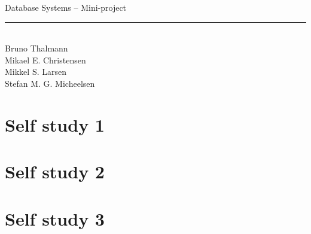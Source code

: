 
\newcommand{\HRule}{\rule{\linewidth}{0.5mm}}


\begin{titlepage}
\centering
{\LARGE Database Systems -- Mini-project}
\HRule \\[0.5cm]
Bruno Thalmann\\
			Mikael E. Christensen\\
			Mikkel S. Larsen\\
			Stefan M. G. Micheelsen
\end{titlepage}

\chapter{Self study 1}


\chapter{Self study 2}


\chapter{Self study 3}


